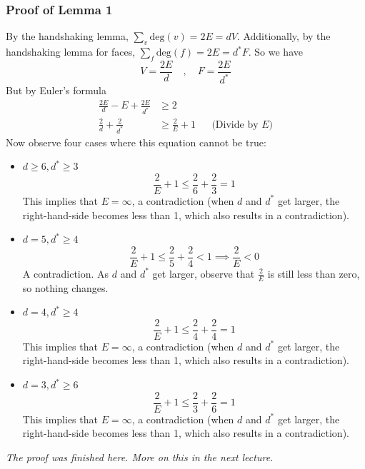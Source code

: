 \documentclass{report}
\begin{document}
\subsubsection{Proof of Lemma 1}
By the handshaking lemma, $\displaystyle \sum_v \mathrm{deg}(v) = 2E = dV$. Additionally, by the handshaking lemma for faces, $\displaystyle \sum_f \mathrm{deg}(f) = 2E = d^*F$. So we have
$$V = \frac{2E}{d} \quad,\quad F = \frac{2E}{d^*}$$
But by Euler's formula
\begin{align*}
\frac{2E}{d} - E + \frac{2E}{d^*} &\geq 2 \\
\frac{2}{d} + \frac{2}{d^*} &\geq \frac{2}{E} + 1 && \text{(Divide by }E)
\end{align*}
Now observe four cases where this equation cannot be true:
\begin{itemize}
\item $d \geq 6, d^* \geq 3$ $$\frac{2}{E} + 1 \leq \frac{2}{6} + \frac{2}{3} = 1$$
This implies that $E = \infty$, a contradiction (when $d$ and $d^*$ get larger, the right-hand-side becomes less than 1, which also results in a contradiction).
\item $d=5, d^* \geq 4$ $$\frac{2}{E} + 1 \leq \frac{2}{5} + \frac{2}{4} < 1 \implies \frac{2}{E}  < 0$$
A contradiction. As $d$ and $d^*$ get larger, observe that $\frac{2}{E}$ is still less than zero, so nothing changes.
\item $d=4, d^* \geq 4$ $$\frac{2}{E} + 1 \leq \frac{2}{4} + \frac{2}{4} = 1$$
This implies that $E = \infty$, a contradiction (when $d$ and $d^*$ get larger, the right-hand-side becomes less than 1, which also results in a contradiction).
\item $d=3, d^* \geq 6$ $$\frac{2}{E} + 1 \leq \frac{2}{3} + \frac{2}{6} = 1$$
This implies that $E = \infty$, a contradiction (when $d$ and $d^*$ get larger, the right-hand-side becomes less than 1, which also results in a contradiction).
\end{itemize}
\begin{center}
\textit{The proof was finished here. More on this in the next lecture.}
\end{center}
\end{document}
